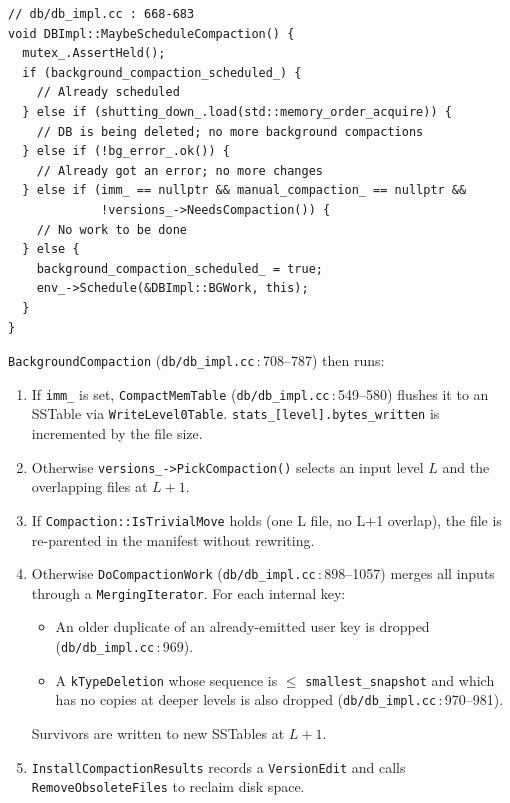 \documentclass[11pt,a4paper]{article}
\newcommand{\codref}[2]{\textcolor{accent}{\texttt{\small#1}}\,$\!:\!$\textcolor{primary!70!black}{\small#2}}
\newcommand{\sym}[1]{\texttt{#1}}
\begin{document}
\begin{lstlisting}
// db/db_impl.cc : 668-683
void DBImpl::MaybeScheduleCompaction() {
  mutex_.AssertHeld();
  if (background_compaction_scheduled_) {
    // Already scheduled
  } else if (shutting_down_.load(std::memory_order_acquire)) {
    // DB is being deleted; no more background compactions
  } else if (!bg_error_.ok()) {
    // Already got an error; no more changes
  } else if (imm_ == nullptr && manual_compaction_ == nullptr &&
             !versions_->NeedsCompaction()) {
    // No work to be done
  } else {
    background_compaction_scheduled_ = true;
    env_->Schedule(&DBImpl::BGWork, this);
  }
}
\end{lstlisting}

\sym{BackgroundCompaction} (\codref{db/db\_impl.cc}{708--787}) then runs:
\begin{enumerate}[leftmargin=1.6em,itemsep=2pt]
    \item If \sym{imm\_} is set, \sym{CompactMemTable}
          (\codref{db/db\_impl.cc}{549--580}) flushes it to an SSTable via
          \sym{WriteLevel0Table}. \sym{stats\_[level].bytes\_written} is
          incremented by the file size.
    \item Otherwise \sym{versions\_->PickCompaction()} selects an input level
          $L$ and the overlapping files at $L{+}1$.
    \item If \sym{Compaction::IsTrivialMove} holds (one L file, no L+1
          overlap), the file is re-parented in the manifest without rewriting.
    \item Otherwise \sym{DoCompactionWork}
          (\codref{db/db\_impl.cc}{898--1057}) merges all inputs through a
          \sym{MergingIterator}. For each internal key:
          \begin{itemize}[leftmargin=1.2em,itemsep=1pt]
              \item An older duplicate of an already-emitted user key is
                    dropped (\codref{db/db\_impl.cc}{969}).
              \item A \sym{kTypeDeletion} whose sequence is $\le$
                    \sym{smallest\_snapshot} and which has no copies at
                    deeper levels is also dropped (\codref{db/db\_impl.cc}{970--981}).
          \end{itemize}
          Survivors are written to new SSTables at $L{+}1$.
    \item \sym{InstallCompactionResults} records a \sym{VersionEdit} and
          calls \sym{RemoveObsoleteFiles} to reclaim disk space.
\end{enumerate}
\end{document}
